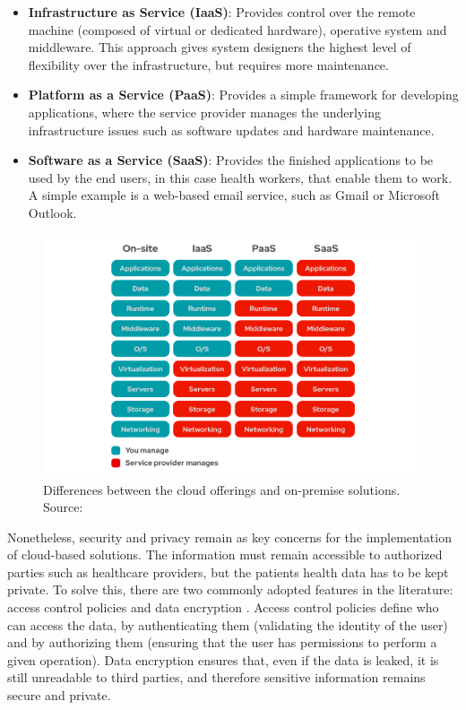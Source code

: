 \begin{itemize}
    \item \textbf{Infrastructure as Service (IaaS)}: Provides control over the remote machine (composed of virtual or dedicated hardware), operative system and middleware. This approach gives system designers the highest level of flexibility over the infrastructure, but requires more maintenance.
    \item \textbf{Platform as a Service (PaaS)}: Provides a simple framework for developing applications, where the service provider manages the underlying infrastructure issues such as software updates and hardware maintenance. 
    \item \textbf{Software as a Service (SaaS)}: Provides the finished applications to be used by the end users, in this case health workers, that enable them to work. A simple example is a web-based email service, such as Gmail or Microsoft Outlook. 
\end{itemize}

\begin{figure}[H]
    \centering
    \includegraphics[width=\linewidth]{images/cloud-services.png}
    \caption[Differences between the cloud offerings and on-premise solutions.]{ Differences between the cloud offerings and on-premise solutions. Source: \cite{RedHat2021}}
    \label{fig:differences-between-cloud-services}
\end{figure}


Nonetheless, security and privacy remain as key concerns for the implementation of cloud-based solutions. The information must remain accessible to authorized parties such as healthcare providers, but the patients health data has to be kept private. To solve this, there are two commonly adopted features in the literature: access control policies and data encryption \cite{Baker2017}. Access control policies define who can access the data, by authenticating them (validating the identity of the user) and by authorizing them (ensuring that the user has permissions to perform a given operation). Data encryption ensures that, even if the data is leaked, it is still unreadable to third parties, and therefore sensitive information remains secure and private. \bigskip

